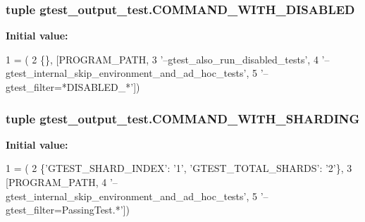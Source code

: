 \subsubsection[{C\+O\+M\+M\+A\+N\+D\+\_\+\+W\+I\+T\+H\+\_\+\+D\+I\+S\+A\+B\+L\+E\+D}]{\setlength{\rightskip}{0pt plus 5cm}tuple gtest\+\_\+output\+\_\+test.\+C\+O\+M\+M\+A\+N\+D\+\_\+\+W\+I\+T\+H\+\_\+\+D\+I\+S\+A\+B\+L\+E\+D}\label{namespacegtest__output__test_a0ef963a39dc8e53616ba2dab9f128def}
{\bfseries Initial value\+:}
\begin{DoxyCode}
1 = (
2     \{\}, [PROGRAM\_PATH,
3          \textcolor{stringliteral}{'--gtest\_also\_run\_disabled\_tests'},
4          \textcolor{stringliteral}{'--gtest\_internal\_skip\_environment\_and\_ad\_hoc\_tests'},
5          \textcolor{stringliteral}{'--gtest\_filter=*DISABLED\_*'}])
\end{DoxyCode}
\hypertarget{namespacegtest__output__test_a462eef2a00782001d491b7a38a847bec}{}
\subsubsection[{C\+O\+M\+M\+A\+N\+D\+\_\+\+W\+I\+T\+H\+\_\+\+S\+H\+A\+R\+D\+I\+N\+G}]{\setlength{\rightskip}{0pt plus 5cm}tuple gtest\+\_\+output\+\_\+test.\+C\+O\+M\+M\+A\+N\+D\+\_\+\+W\+I\+T\+H\+\_\+\+S\+H\+A\+R\+D\+I\+N\+G}\label{namespacegtest__output__test_a462eef2a00782001d491b7a38a847bec}
{\bfseries Initial value\+:}
\begin{DoxyCode}
1 = (
2     \{\textcolor{stringliteral}{'GTEST\_SHARD\_INDEX'}: \textcolor{stringliteral}{'1'}, \textcolor{stringliteral}{'GTEST\_TOTAL\_SHARDS'}: \textcolor{stringliteral}{'2'}\},
3     [PROGRAM\_PATH,
4      \textcolor{stringliteral}{'--gtest\_internal\_skip\_environment\_and\_ad\_hoc\_tests'},
5      \textcolor{stringliteral}{'--gtest\_filter=PassingTest.*'}])
\end{DoxyCode}
\hypertarget{namespacegtest__output__test_a1c27d93a57990d21461436f2d5ff3064}{}
